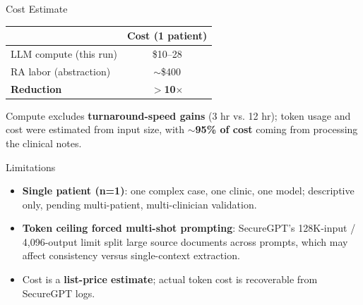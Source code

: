 \documentclass[final]{beamer}
\newlength{\colnarrow}  %
\begin{document}
\begin{frame}[t]
\begin{columns}[t]
\begin{column}{\colnarrow}
\begin{block}{Cost Estimate}
    \begin{center}
      \begin{tabular}{lc}
        \toprule
         & \textbf{Cost (1 patient)} \\
        \midrule
        LLM compute (this run) & \$10--28 \\
        RA labor (abstraction) & $\sim$\$400 \\
        \midrule
        \textbf{Reduction}     & \textbf{$>$10$\times$} \\
        \bottomrule
      \end{tabular}
    \end{center}
    \vspace{0.1em}
    Compute excludes \textbf{turnaround-speed gains} (3 hr vs. 12 hr); token usage and cost were estimated from input size, with \textbf{$\sim$95\% of cost} coming from processing the clinical notes.
  \end{block}

  \begin{block}{Limitations}

  \begin{itemize}
  \item \textbf{Single patient (n=1)}: one complex case, one clinic, one model;
        descriptive only, pending multi-patient, multi-clinician validation.
  \item \textbf{Token ceiling forced multi-shot prompting}: SecureGPT's
        128K-input / 4,096-output limit split large source documents across
        prompts, which may affect consistency versus single-context extraction.
  \item Cost is a \textbf{list-price estimate}; actual token cost is recoverable
        from SecureGPT logs.
\end{itemize}
\vspace{-0.6em}
  \end{block}


\end{column}
\end{columns}
\end{frame}
\end{document}
